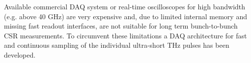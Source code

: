 Available commercial DAQ system or real-time oscilloscopes for high bandwidth (e.g. above
40 GHz) are very expensive and, due to limited internal memory and missing fast readout interfaces, are not suitable for long term bunch-to-bunch CSR measurements. To circumvent these limitations a DAQ architecture for fast and continuous sampling of the individual ultra-short THz pulses has been developed.


%
%
%
%
%
%
%
%
